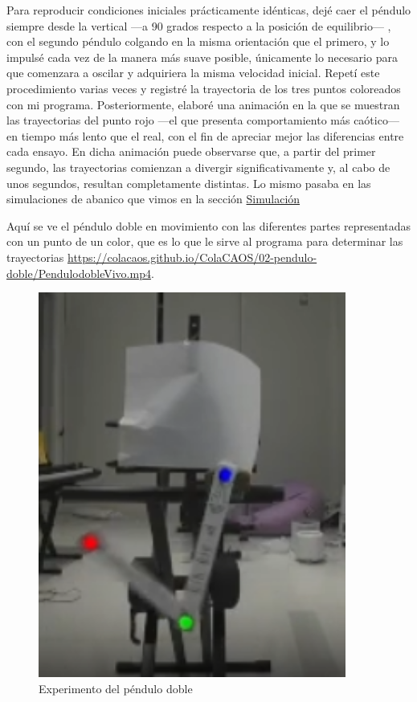 \documentclass[
  10pt,
  a4paper,
  DIV=11,
  numbers=noendperiod,
  open=any]{scrreprt}
\numberwithin{equation}{chapter}
\numberwithin{equation}{section}
\renewcommand{\[}{\begin{equation}}
\renewcommand{\]}{\end{equation}}
\begin{document}
Para reproducir condiciones iniciales prácticamente idénticas, dejé caer
el péndulo siempre desde la vertical ---a 90 grados respecto a la
posición de equilibrio--- , con el segundo péndulo colgando en la misma
orientación que el primero, y lo impulsé cada vez de la manera más suave
posible, únicamente lo necesario para que comenzara a oscilar y
adquiriera la misma velocidad inicial. Repetí este procedimiento varias
veces y registré la trayectoria de los tres puntos coloreados con mi
programa. Posteriormente, elaboré una animación en la que se muestran
las trayectorias del punto rojo ---el que presenta comportamiento más
caótico--- en tiempo más lento que el real, con el fin de apreciar mejor
las diferencias entre cada ensayo. En dicha animación puede observarse
que, a partir del primer segundo, las trayectorias comienzan a divergir
significativamente y, al cabo de unos segundos, resultan completamente
distintas. Lo mismo pasaba en las simulaciones de abanico que vimos en
la sección \hyperref[sec-abanico]{Simulación}

Aquí se ve el péndulo doble en movimiento con las diferentes partes
representadas con un punto de un color, que es lo que le sirve al
programa para determinar las trayectorias \url{https://colacaos.github.io/ColaCAOS/02-pendulo-doble/PendulodobleVivo.mp4}.

\begin{figure}[h]
  \centering
  \includegraphics[width=0.9\textwidth]{02-pendulo-doble/DobleReal.png}
  \caption{Experimento del péndulo doble}
\end{figure}
\end{document}
